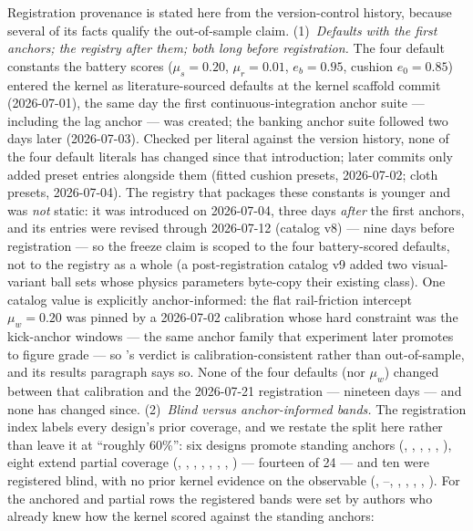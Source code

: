 Registration provenance is stated here from the version-control history,
because several of its facts qualify the out-of-sample claim.
(1)~\emph{Defaults with the first anchors; the registry after them;
both long before registration.} The four default constants the battery
scores ($\mu_s = 0.20$, $\mu_r = 0.01$, $e_b = 0.95$, cushion
$e_0 = 0.85$) entered the kernel as literature-sourced defaults at the
kernel scaffold commit (2026-07-01), the same day the
first continuous-integration anchor suite --- including the lag anchor
--- was created; the banking anchor suite followed
two days later (2026-07-03). Checked per literal
against the version history, none of the four default literals has
changed since that introduction; later commits only added preset
entries alongside them (fitted cushion presets, 2026-07-02; cloth
presets, 2026-07-04). The  registry that
packages these constants is younger and was \emph{not} static: it was
introduced on 2026-07-04, three days \emph{after}
the first anchors, and its entries were revised through 2026-07-12
(catalog v8) --- nine days before registration --- so
the freeze claim is scoped to the four battery-scored defaults, not to
the registry as a whole (a post-registration catalog v9 added two
visual-variant ball sets whose physics parameters byte-copy their
existing class). One catalog value is explicitly anchor-informed: the
flat rail-friction intercept $\mu_w = 0.20$ was pinned by a 2026-07-02
calibration whose hard constraint was the kick-anchor windows
--- the same anchor family that experiment 
later promotes to figure grade --- so 's verdict is
calibration-consistent rather than out-of-sample, and its results
paragraph says so. None of the four defaults (nor $\mu_w$) changed
between that calibration and the 2026-07-21 registration --- nineteen
days --- and none has changed since.
(2)~\emph{Blind versus anchor-informed bands.} The registration index
labels every design's prior coverage, and we restate the split here
rather than leave it at ``roughly 60\%'': six designs promote standing
anchors (, , , , ,
), eight extend partial coverage (, ,
, , , , , )
--- fourteen of 24 --- and ten were registered blind, with no prior
kernel evidence on the observable (, --,
, , , , ). For the
anchored and partial rows the registered bands were set by authors who
already knew how the kernel scored against the standing anchors:
